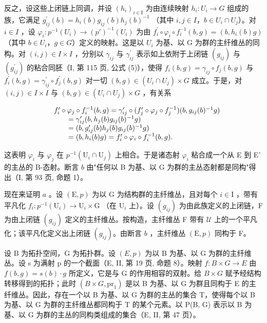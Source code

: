 反之，设这些上闭链上同调，并设 \((h_{i})_{i\in\mathrm{I}}\) 为由连续映射 \(h_{i}\colon U_{i}\to G\) 组成的族，它满足 \(g_{ij}^{\prime}(b)=h_{i}(b)g_{ij}(b)h_{j}(b)^{-1}\) （其中 \(i,j\in I\)，\(b\in U_{i}\cap U_{j}\)）。对 \(i\in I\) ，设 \(\varphi_{i}\colon p^{-1}(U_{i})\to(p')^{-1}(U_{i})\) 为由 \(f_{i}^{\prime}\circ\varphi_{i}\circ f_{i}^{-1}(b,g)=(b,h_{i}(b)g)\) （其中 \(b\in U_{i}\)，\(g\in G\)）定义的映射。这是以 \(U_{i}\) 为基、以 G 为群的主纤维丛的同构。对 \((i,j)\in I\times I\) ，分别以 \(\gamma_{ij}\) 与 \(\gamma_{ij}^{\prime}\) 表示如上依附于上闭链 \((g_{ij})\) 与 \((g_{ij}^{\prime})\) 的粘合同胚（I, 第 115 页, 公式 (5)），使得 \(f_{i}(b,g)=\gamma_{ij}\circ f_{j}(b,g)\) 与 \(f_{i}^{\prime}(b,g)=\gamma_{ij}^{\prime}\circ f_{j}^{\prime}(b,g)\) 对一切 \((b,g)\in(U_{i}\cap U_{j})\times G\) 成立。于是，对 \((i,j)\in I\times I\) 与 \((b,g)\in(U_{i}\cap U_{j})\times G\) ，有关系

\[
\begin{array}{r l} & f _ {i} ^ {\prime} \circ \varphi_ {j} \circ f _ {i} ^ {- 1} (b, g) = \gamma_ {i j} ^ {\prime} \circ (f _ {j} ^ {\prime} \circ \varphi_ {j} \circ f _ {j} ^ {- 1}) (b, g _ {i j} (b) ^ {- 1} g) \\ & \qquad = \gamma_ {i j} ^ {\prime} (b, h _ {j} (b) g _ {i j} (b) ^ {- 1} g) \\ & \qquad = (b, g _ {i j} ^ {\prime} (b) h _ {j} (b) g _ {i j} (b) ^ {- 1} g) \\ & \qquad = (b, h _ {i} (b) g) = f _ {i} ^ {\prime} \circ \varphi_ {i} \circ f _ {i} ^ {- 1} (b, g). \end{array}
\]

这表明 \(\varphi_{i}\) 与 \(\varphi_{j}\) 在 \(p^{-1}(\mathrm{U}_{i}\cap\mathrm{U}_{j})\) 上相合。于是诸态射 \(\varphi_{i}\) 粘合成一个从 E 到 E' 的主丛的 B-态射。断言 \(b\) 由"任何以 B 为基、以 G 为群的主丛态射都是同构"得出（I, 第 93 页, 命题 1）。

现在来证明 \(a\) 。设 \((\mathrm{E}, p)\) 为以 G 为结构群的主纤维丛，且对每个 \(i \in \mathrm{I}\) ，带有平凡化 \(f_i: p^{-1}(\mathrm{U}_i) \to \mathrm{U}_i \times \mathrm{G}\) （在 \(\mathrm{U}_i\) 上）。设 \((g_{ij})\) 为由此族定义的上闭链，F 为由上闭链 \((g_{ij})\) 定义的主纤维丛。按构造，主纤维丛 F 带有 \(\mathcal{U}\) 上的一个平凡化；该平凡化定义出上闭链 \((g_{ij})\)。由断言 \(b\) ，主纤维丛 \((\mathrm{E}, p)\) 同构于 F。

设 B 为拓扑空间，G 为拓扑群。设 \((E,p)\) 为以 B 为基、以 G 为群的主纤维丛。设 s 为满射 p 的一个截面（E, II, 第 19 页, 命题 8）。映射 \(f\colon B\times G\to E\) 由 \(f(b,g)=s(b)\cdot g\) 所定义，它是与 G 的作用相容的双射。给 \(B\times G\) 赋予经结构转移得到的拓扑；此时 \((B\times G,\mathrm{pr}_{1})\) 是以 B 为基、以 G 为群且同构于 E 的主纤维丛。因此，存在一个以 B 为基、以 G 为群的主丛的集合 T，使得每个以 B 为基、以 G 为群的主纤维丛都同构于 T 的某个元素。以 P(B, G) 表示以 B 为基、以 G 为群的主丛的同构类组成的集合（E, II, 第 47 页）。

